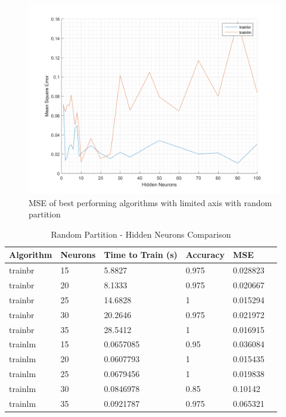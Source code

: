 \documentclass[a4paper, 10pt, conference]{ieeeconf}
\begin{document}
\begin{figure}[!ht]
    \centering
    \includegraphics[width=\linewidth]{pic/mixed_best_limited.png}
    \caption{MSE of best performing algorithms with limited axis with random partition}
    \label{fig:mixed_limited}
\end{figure}

\begin{table}
\centering
\caption{Random Partition - Hidden Neurons Comparison}
\label{tbl:mixed}
\begin{tabular}{llllll}
\hline
\textbf{Algorithm} & \textbf{Neurons} & \textbf{Time to Train (s)} & \textbf{Accuracy} & \textbf{MSE} \\ \hline
trainbr & 15 & 5.8827 & 0.975 & 0.028823 \\ \hline
trainbr & 20 & 8.1333 & 0.975 & 0.020667 \\ \hline
trainbr & 25 & 14.6828 & 1 & 0.015294 \\ \hline
trainbr & 30 & 20.2646 & 0.975 & 0.021972 \\ \hline
trainbr & 35 & 28.5412 & 1 & 0.016915 \\ \hline

trainlm & 15 & 0.0657085 & 0.95 & 0.036084 \\ \hline
trainlm & 20 & 0.0607793 & 1 & 0.015435 \\ \hline
trainlm & 25 & 0.0679456 & 1 & 0.019838 \\ \hline
trainlm & 30 & 0.0846978 & 0.85 & 0.10142 \\ \hline
trainlm & 35 & 0.0921787 & 0.975 & 0.065321 \\ \hline
\end{tabular}
\end{table}
\end{document}
